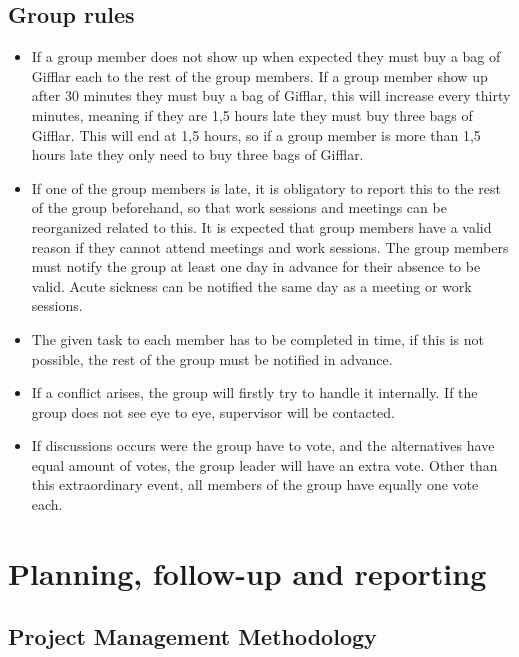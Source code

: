 \subsection{Group rules}
\begin{itemize}
    \item If a group member does not show up when expected they must buy a bag of Gifflar each to the rest of the group members. If a group member show up after 30 minutes they must buy a bag of Gifflar, this will increase every thirty minutes, meaning if they are 1,5 hours late they must buy three bags of Gifflar. This will end at 1,5 hours, so if a group member is more than 1,5 hours late they only need to buy three bags of Gifflar.
    \item If one of the group members is late, it is obligatory to report this to the rest of the group beforehand, so that work sessions and meetings can be reorganized related to this. It is expected that group members have a valid reason if they cannot attend meetings and work sessions. The group members must notify the group at least one day in advance for their absence to be valid. Acute sickness can be notified the same day as a meeting or work sessions.
    \item The given task to each member has to be completed in time, if this is not possible, the rest of the group must be notified in advance.
    \item If a conflict arises, the group will firstly try to handle it internally. If the group does not see eye to eye, supervisor will be contacted.
    \item If discussions occurs were the group have to vote, and the alternatives have equal amount of votes, the group leader will have an extra vote. Other than this extraordinary event, all members of the group have equally one vote each. 
\end{itemize}

\newpage
\section{Planning, follow-up and reporting}

\subsection{Project Management Methodology}

